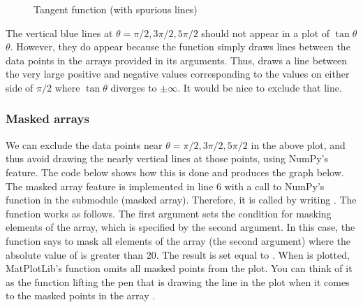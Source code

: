 \documentclass[letterpaper,10pt,english]{sphinxmanual}
\begin{document}
\begin{figure}[htbp]
\centering
\capstart

\noindent{}
\caption{Tangent function (with spurious lines)}\label{\detokenize{chap5/chap5_plot:id6}}\label{\detokenize{chap5/chap5_plot:fig-plotlimits2}}\end{figure}

\sphinxAtStartPar
The vertical blue lines at \(\theta = \pi/2, 3\pi/2, 5\pi/2\) should not appear in a plot of \(\tan\theta\)  \(\theta\).  However, they do appear because the  function simply draws lines between the data points in the \sphinxhyphen{} arrays provided in its arguments.  Thus,  draws a line between the very large positive and negative  values corresponding to the  values on either side of \(\pi/2\) where \(\tan\theta\) diverges to \(\pm\infty\).  It would be nice to exclude that line.


\subsubsection{Masked arrays}
\label{\detokenize{chap5/chap5_plot:masked-arrays}}
\ignorespaces 
\sphinxAtStartPar
We can exclude the data points near \(\theta = \pi/2, 3\pi/2, 5\pi/2\) in the above plot, and thus avoid drawing the nearly vertical lines at those points, using NumPy’s  feature.  The code below shows how this is done and produces the graph below.  The masked array feature is implemented in line 6 with a call to NumPy’s  function in the sub\sphinxhyphen{}module  (masked array).  Therefore, it is called by writing .  The  function works as follows.  The first argument sets the condition for masking elements of the array, which is specified by the second argument.  In this case, the function says to mask all elements of the array  (the second argument) where the absolute value of  is greater than 20.  The result is set equal to .  When  is plotted, MatPlotLib’s  function omits all masked points from the plot.  You can think of it as the  function lifting the pen that is drawing the line in the plot when it comes to the masked points in the array .
\end{document}

